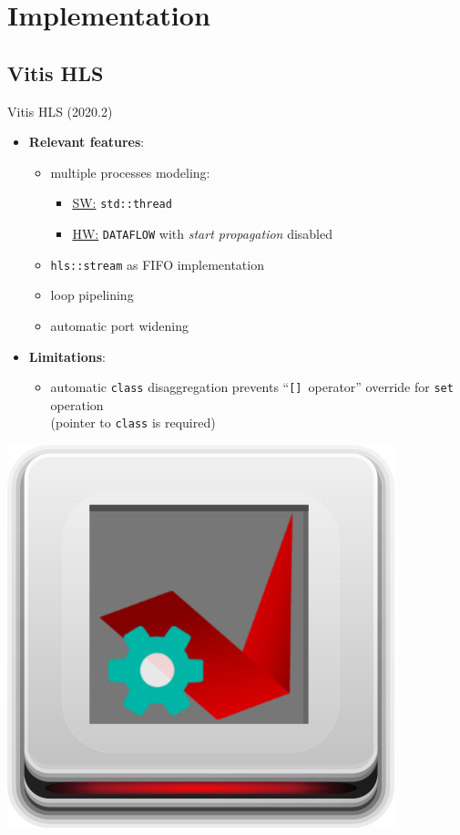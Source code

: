 \documentclass{beamer}
\begin{document}
\section{Implementation}
\subsection{Vitis HLS}
\begin{frame}{Vitis HLS (2020.2)}
	\begin{minipage}{.89\textwidth}
		\begin{itemize}
			\item \textbf{Relevant features}:
				\begin{itemize}
					\item multiple processes modeling:
						\begin{itemize}
							\item \underline{SW:} \texttt{std::thread}
							\item \underline{HW:} \texttt{DATAFLOW} with
								\textit{start propagation} disabled
						\end{itemize}
					\item \texttt{hls::stream} as FIFO implementation
					\item loop pipelining
					\item automatic port widening
				\end{itemize}
			\item \textbf{Limitations}:
				\begin{itemize}
					\item automatic \texttt{class} disaggregation
						prevents ``\texttt{[]}~operator''
						override for \texttt{set} operation\\
						(pointer to \texttt{class} is required)
				\end{itemize}
		\end{itemize}
	\end{minipage}
	\begin{minipage}{.1\textwidth}
		\begin{center}
			\includegraphics[width=.9\textwidth]{vitislogo.png}

\end{center}
\end{minipage}
\end{frame}
\end{document}
